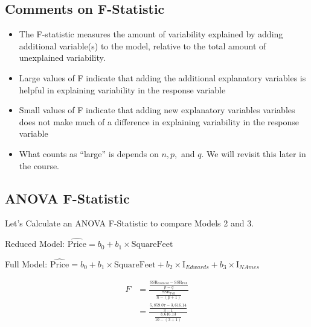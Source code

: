 \documentclass[]{book}
\newenvironment{Shaded}{\begin{snugshade}}{\end{snugshade}}
\newcommand{\KeywordTok}[1]{\textcolor[rgb]{0.13,0.29,0.53}{\textbf{#1}}}
\newcommand{\DecValTok}[1]{\textcolor[rgb]{0.00,0.00,0.81}{#1}}
\newcommand{\StringTok}[1]{\textcolor[rgb]{0.31,0.60,0.02}{#1}}
\newcommand{\OperatorTok}[1]{\textcolor[rgb]{0.81,0.36,0.00}{\textbf{#1}}}
\newcommand{\NormalTok}[1]{#1}
\begin{document}
\subsection{Comments on F-Statistic}\label{comments-on-f-statistic}

\begin{itemize}
\item
  The F-statistic measures the amount of variability explained by adding
  additional variable(s) to the model, relative to the total amount of
  unexplained variability.
\item
  Large values of F indicate that adding the additional explanatory
  variables is helpful in explaining variability in the response
  variable\\
\item
  Small values of F indicate that adding new explanatory variables
  variables does not make much of a difference in explaining variability
  in the response variable\\
\item
  What counts as ``large'' is depends on \(n, p,\) and \(q\). We will
  revisit this later in the course.
\end{itemize}

\subsection{ANOVA F-Statistic}\label{anova-f-statistic}

Let's Calculate an ANOVA F-Statistic to compare Models 2 and 3.

Reduced Model:
\(\widehat{\text{Price}}= b_0+ b_1 \times\text{SquareFeet}\)

Full Model:
\(\widehat{\text{Price}}= b_0+ b_1 \times\text{SquareFeet}+ b_2\times\text{I}_{Edwards} + b_3 \times\text{I}_{NAmes}\)

\[
\begin{aligned}
F &= \frac{\frac{\text{SSR}_{\text{Reduced}}-\text{SSR}_{\text{Full}}}{p-q}}{\frac{\text{SSR}_{\text{Full}}}{n-(p+1)}} \\
&=\frac{\frac{5,859.07-3,616.14}{3-1}}{\frac{3,616.13}{10-(3+1)}} \\
\end{aligned}
\]

\begin{Shaded}
\end{Shaded}
\end{document}
